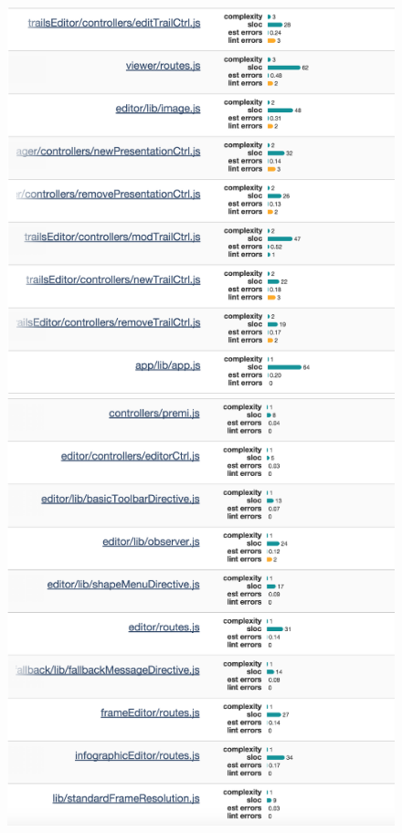 \pagebreak

\begin{figure}[h!]
	\centering
	\includegraphics[scale=.43]{img/lint3.png}
	\centering
	\includegraphics[scale=.43]{img/lint4.png}
\end{figure} 

